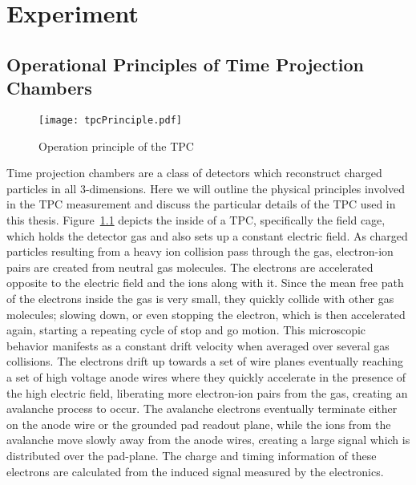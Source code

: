 \chapter{Experiment}

\section{Operational Principles of Time Projection Chambers}


\begin{figure}
\texttt{[image: tpcPrinciple.pdf]}
\label{fig:tpcPrinciple}
\caption{Operation principle of the TPC}
\end{figure}
Time projection chambers are a class of detectors which reconstruct charged particles in all 3-dimensions. Here we will outline the physical principles involved in the TPC measurement and discuss the particular details of the TPC used in this thesis. Figure~\ref{fig:tpcPrinciple} depicts the inside of a TPC, specifically the field cage, which holds the detector gas and also sets up a constant electric field. As charged particles resulting from a heavy ion collision pass through the gas, electron-ion pairs are created from neutral gas molecules. The electrons are accelerated opposite to the electric field and the ions along with it. Since the mean free path of the electrons inside the gas is very small, they quickly collide with other gas molecules; slowing down, or even stopping the electron, which is then accelerated again, starting a repeating cycle of stop and go motion. This microscopic behavior manifests as a constant drift velocity when averaged over several gas collisions. The electrons drift up towards a set of wire planes eventually reaching a set of high voltage anode wires where they quickly accelerate in the presence of the high electric field, liberating more electron-ion pairs from the gas, creating an avalanche process to occur. The avalanche electrons eventually terminate either on the anode wire or the grounded pad readout plane,  while the ions from the avalanche move slowly away from the anode wires, creating a large signal which is distributed over the pad-plane. The charge and timing  information of these electrons are calculated from the induced signal measured by the  electronics. 

